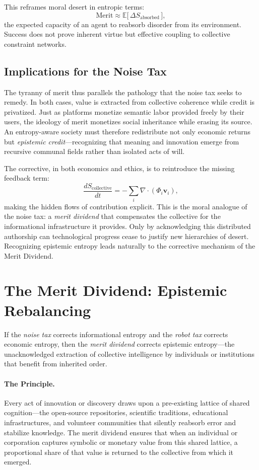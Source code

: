 \documentclass[12pt]{article}
\begin{document}
This reframes moral desert in entropic terms:
\[
\text{Merit} \approx \mathbb{E}\big[\, \Delta S_\text{absorbed} \,\big],
\]
the expected capacity of an agent to reabsorb disorder from its environment. Success does not prove inherent virtue but effective coupling to collective constraint networks.

\subsection{Implications for the Noise Tax}
The tyranny of merit thus parallels the pathology that the noise tax seeks to remedy. In both cases, value is extracted from collective coherence while credit is privatized. Just as platforms monetize semantic labor provided freely by their users, the ideology of merit monetizes social inheritance while erasing its source. An entropy-aware society must therefore redistribute not only economic returns but \emph{epistemic credit}—recognizing that meaning and innovation emerge from recursive communal fields rather than isolated acts of will.

The corrective, in both economics and ethics, is to reintroduce the missing feedback term:
\[
\frac{dS_\text{collective}}{dt} = -\sum_i \nabla\!\cdot(\Phi_i \mathbf{v}_i),
\]
making the hidden flows of contribution explicit. This is the moral analogue of the noise tax: a \emph{merit dividend} that compensates the collective for the informational infrastructure it provides. Only by acknowledging this distributed authorship can technological progress cease to justify new hierarchies of desert. Recognizing epistemic entropy leads naturally to the corrective mechanism of the Merit Dividend.

\section{The Merit Dividend: Epistemic Rebalancing}
If the \emph{noise tax} corrects informational entropy and the \emph{robot tax} corrects economic entropy, then the \emph{merit dividend} corrects epistemic entropy—the unacknowledged extraction of collective intelligence by individuals or institutions that benefit from inherited order.

\paragraph{The Principle.}
Every act of innovation or discovery draws upon a pre-existing lattice of shared cognition—the open-source repositories, scientific traditions, educational infrastructures, and volunteer communities that silently reabsorb error and stabilize knowledge. The merit dividend ensures that when an individual or corporation captures symbolic or monetary value from this shared lattice, a proportional share of that value is returned to the collective from which it emerged.
\end{document}

